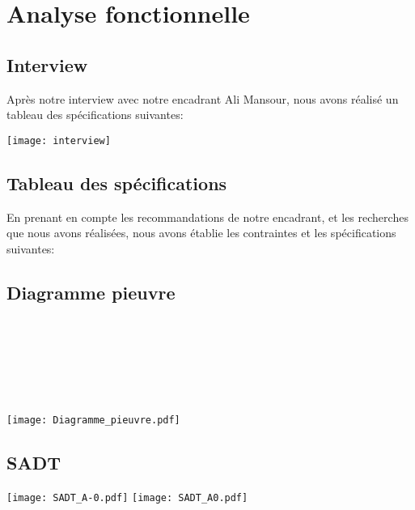 \chapter{Analyse fonctionnelle}

\section{Interview}

Après notre interview avec notre encadrant Ali Mansour, nous avons réalisé un tableau des spécifications suivantes:

\texttt{[image: interview]}


\section{Tableau des spécifications}
En prenant en compte les recommandations de notre encadrant, et les recherches que nous avons réalisées, nous avons établie les contraintes et les spécifications suivantes:





\section{Diagramme pieuvre}
~\\
~\\
~\\
~\\
~\\
~\\
\hspace{-2cm}
\texttt{[image: Diagramme\_pieuvre.pdf]}



\section{SADT}

\texttt{[image: SADT\_A-0.pdf]}
\texttt{[image: SADT\_A0.pdf]}

